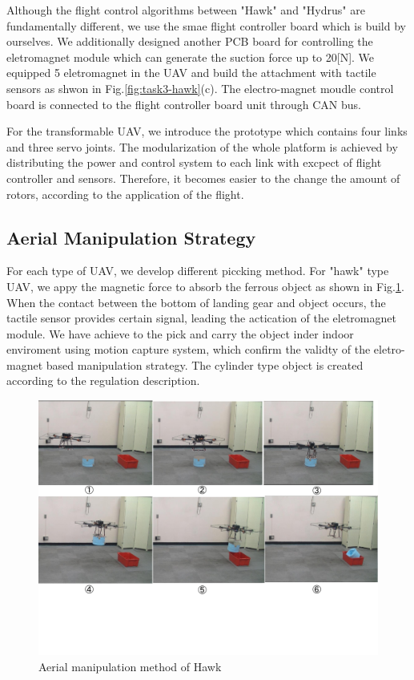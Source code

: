 \documentclass{standalone}
\begin{document}
Although the flight control algorithms between "Hawk" and "Hydrus" are fundamentally different, we use the smae flight controller board which is build by ourselves. We additionally designed another PCB board for controlling the eletromagnet module which can generate the suction force up to 20[N]. We equipped 5 eletromagnet in the UAV and build the attachment with tactile sensors as shwon in Fig.\ref{fig:task3-hawk}(c). The electro-magnet moudle control board is connected to the flight  controller board unit through CAN bus.

For the transformable UAV, we introduce the prototype which contains four links and three servo joints. The modularization of the whole platform is achieved by distributing the power and control system to each link with excpect of flight controller and sensors. Therefore, it becomes easier to the change the amount of rotors, according to the application of the flight.

\subsection{Aerial Manipulation Strategy}
For each type of UAV, we develop different piccking method. For "hawk" type UAV, we appy the magnetic force to absorb the ferrous object as shown in Fig.\ref{fig:task3-hawk-manipulation}. When the contact between the bottom of landing gear and object occurs, the tactile sensor provides certain signal, leading the actication of the eletromagnet module. We have achieve to the pick and carry the object inder indoor enviroment using motion capture system, which confirm the validty of the eletro-magnet based manipulation strategy. The cylinder type object is created according to the regulation description.

\begin{figure}[h]
  \begin{center}
    \includegraphics[clip,  bb=0 110 720 540,  width=\columnwidth]{sections/task3/images/task3-tarrot810-manipulation.pdf}
    \caption{Aerial manipulation method of Hawk}
    \label{fig:task3-hawk-manipulation}
  \end{center}
\end{figure} 
\end{document}
